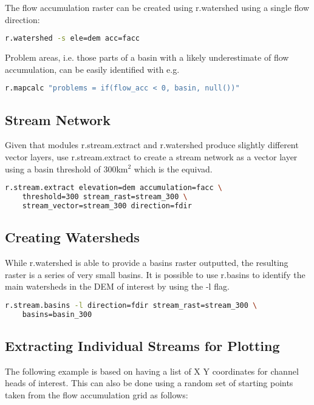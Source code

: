 The flow accumulation raster can be created using r.watershed using a single flow direction:

\begin{lstlisting}[language=bash]
r.watershed -s ele=dem acc=facc 
\end{lstlisting} 

Problem areas, i.e. those parts of a basin with a likely underestimate of flow accumulation, can be easily identified with e.g.

\begin{lstlisting}[language=bash]
r.mapcalc "problems = if(flow_acc < 0, basin, null())" 
\end{lstlisting} 

\subsection{Stream Network}

Given that modules r.stream.extract and r.watershed produce slightly different vector layers, use r.stream.extract to create a stream network as a vector layer using a basin threshold of 300km${^2}$ which is the equivad.
 
\begin{lstlisting}[language=bash]
r.stream.extract elevation=dem accumulation=facc \
	threshold=300 stream_rast=stream_300 \
	stream_vector=stream_300 direction=fdir
\end{lstlisting}

\subsection{Creating Watersheds}

While r.watershed is able to provide a basins raster outputted, the resulting raster is a series of very small basins. It is possible to use r.basins to identify the main watersheds in the DEM of interest by using the -l flag. 

\begin{lstlisting}[language=bash]
r.stream.basins -l direction=fdir stream_rast=stream_300 \
	basins=basin_300
\end{lstlisting}


\subsection{Extracting Individual Streams for Plotting}

The following example is based on having a list of X Y coordinates for channel heads of interest. This can also be done using a random set of starting points taken from the flow accumulation grid as follows:

